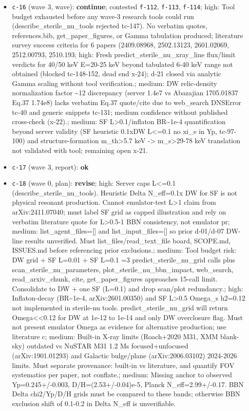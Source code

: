 \documentclass[11pt,a4paper]{article}
\begin{document}
\begin{itemize}
  \item \texttt{c-16} (wave 3, wave): \textbf{continue}; contested \texttt{f-112}, \texttt{f-113}, \texttt{f-114}; high: Tool budget exhausted before any wave-3 research tools could run (describe\_sterile\_nu\_tools rejected tc-147). No verbatim quotes, references.bib, get\_paper\_figures, or Gamma tabulation produced; literature survey success criteria for 6 papers (2409.08968, 2502.13123, 2601.02069, 2512.00793, 2510.193; high: Fresh predict\_sterile\_nu\_xray\_line flux/limit verdicts for 40/50 keV E=20-25 keV beyond tabulated 6-40 keV range not obtained (blocked tc-148-152, dead end x-24); d-21 closed via analytic Gamma scaling without tool verification.; medium: DW relic-density normalization factor \textasciitilde{}12 discrepancy (server 1.4e7 vs Abazajian 1705.01837 Eq.37 1.74e8) lacks verbatim Eq.37 quote/cite due to web\_search DNSError tc-40 and generic snippets tc-131; medium confidence without published cross-check (x-22).; medium: SF L\textgreater{}0.1/inflaton BR\textasciitilde{}1e-4 quantification beyond server validity (SF heuristic 0.1xDW L\textless{}=0.1 no xi\_e in Yp, tc-97-100) and structure-formation m\_th\textgreater{}5.7 keV -\textgreater{} m\_s\textgreater{}29-78 keV translation not validated with tool; remaining open x-21.
  \item \texttt{c-17} (wave 3, report): \textbf{ok}
  \item \texttt{c-18} (wave 0, plan): \textbf{revise}; high: Server caps L\textless{}=0.1 (describe\_sterile\_nu\_tools). Heuristic Delta N\_eff=0.1x DW for SF is not physical resonant production. Cannot emulator-test L\textgreater{}1 claim from arXiv:2411.07040; must label SF grid as capped illustration and rely on verbatim literature quote for L\textgreater{}0.5-1 BBN consistency, not emulator pr; medium: list\_agent\_files=[] and list\_input\_files=[] so prior d-01/d-07 DW-line results unverified. Must list\_files/read\_text\_file board, SCOPE.md, ISSUES.md before referencing prior exclusions.; medium: Tool budget risk: DW grid + SF L=0.01 + SF L=0.1 =3 predict\_sterile\_nu\_grid calls plus scan\_sterile\_nu\_parameters, plot\_sterile\_nu\_bbn\_impact, web\_search, read\_arxiv\_chunk, cite, get\_paper\_figures approaches 15-call limit. Consolidate to DW + one SF (L=0.1) and drop scan/plot redundancy.; high: Inflaton-decay (BR\textasciitilde{}1e-4, arXiv:2601.00350) and SF L\textgreater{}0.5 Omega\_s h2=0.12 not implemented in sterile-nu tools. predict\_sterile\_nu\_grid will return Omega\textless{}\textless{}0.12 for DW at 1e-12 to 1e-14 and only DW overclosure flag. Must not present emulator Omega as evidence for alternative production; use literature c; medium: Built-in X-ray limits (Roach+2020 M31, XMM blank-sky) outdated vs NuSTAR M31 1.2 Ms focused+unfocused (arXiv:1901.01293) and Galactic bulge/plane (arXiv:2006.03102) 2024-2026 limits. Must separate provenance: built-in vs literature, and quantify FOV systematics per paper, not conflate.; medium: Missing anchor to observed Yp=0.245+/-0.003, D/H=(2.53+/-0.04)e-5, Planck N\_eff=2.99+/-0.17. BBN Delta chi2/Yp/D/H grids must be compared to these bands; otherwise BBN exclusion shift of 0.1-0.2 in Delta N\_eff is unverifiable.

\end{itemize}
\end{document}

